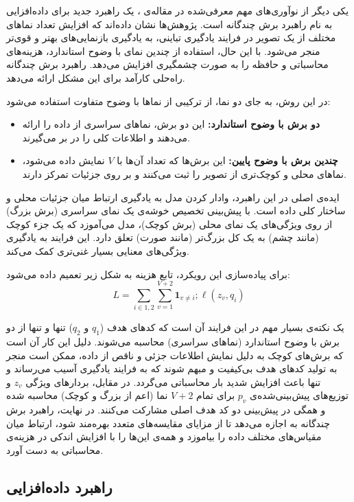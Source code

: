 یکی دیگر از نوآوری‌های مهم معرفی‌شده در مقاله‌ی ، یک راهبرد جدید برای داده‌افزایی به نام راهبرد برش چندگانه است.
پژوهش‌ها نشان داده‌اند که افزایش تعداد نماهای مختلف از یک تصویر در فرایند یادگیری تباینی، به یادگیری بازنمایی‌های بهتر و قوی‌تر منجر می‌شود. با این حال، استفاده از چندین نمای با وضوح
استاندارد، هزینه‌های محاسباتی و حافظه را به صورت چشمگیری افزایش می‌دهد. راهبرد برش چندگانه راه‌حلی کارآمد برای این مشکل ارائه می‌دهد.

در این روش، به جای دو نما، از ترکیبی از نماها با وضوح متفاوت استفاده می‌شود:
\begin{itemize}
\item \textbf{دو برش با وضوح استاندارد:} این دو برش، نماهای سراسری از داده را ارائه می‌دهند و اطلاعات کلی را در بر می‌گیرند.
\item \textbf{چندین برش با وضوح پایین:} این برش‌ها که تعداد آن‌ها با 
$V$
نمایش داده می‌شود، نماهای محلی و کوچک‌تری از تصویر را ثبت می‌کنند و بر روی جزئیات تمرکز دارند.
\end{itemize}
ایده‌ی اصلی در این راهبرد، وادار کردن مدل به یادگیری ارتباط میان جزئیات محلی و ساختار کلی داده است. با پیش‌بینی تخصیص خوشه‌ی یک نمای سراسری (برش بزرگ) از روی ویژگی‌های یک نمای محلی (برش کوچک)، مدل می‌آموزد که یک جزء کوچک (مانند چشم) به یک کل بزرگ‌تر (مانند صورت) تعلق دارد. این فرایند به یادگیری ویژگی‌های معنایی بسیار غنی‌تری کمک می‌کند.

برای پیاده‌سازی این رویکرد، تابع هزینه به شکل زیر تعمیم داده می‌شود:
\begin{equation}
L = \sum_{i \in {1, 2}} \sum_{v=1}^{V+2} \mathbf{1}_{v \neq i} ; \ell(z_v, q_i)
\label{eq:multicrop_loss}
\end{equation}

یک نکته‌ی بسیار مهم در این فرایند آن است که کدهای هدف
($q_1$ و $q_2$)
تنها و تنها از دو برش با وضوح استاندارد (نماهای سراسری) محاسبه می‌شوند. دلیل این کار آن است که برش‌های کوچک به دلیل نمایش اطلاعات جزئی و ناقص از داده، ممکن است منجر به تولید کدهای هدف بی‌کیفیت و مبهم شوند که به فرایند یادگیری آسیب می‌رساند و تنها باعث افزایش شدید بار محاسباتی می‌گردد. در مقابل، بردارهای ویژگی
$z_v$
و توزیع‌های پیش‌بینی‌شده‌ی
$p_v$
برای تمام
$V+2$
نما (اعم از بزرگ و کوچک) محاسبه شده و همگی در پیش‌بینی دو کد هدف اصلی مشارکت می‌کنند. در نهایت، راهبرد برش چندگانه به  اجازه می‌دهد تا از مزایای مقایسه‌های متعدد بهره‌مند شود، ارتباط میان مقیاس‌های مختلف داده را بیاموزد و همه‌ی این‌ها را با افزایش اندکی در هزینه‌ی محاسباتی به دست آورد.

\subsection{راهبرد داده‌افزایی}

